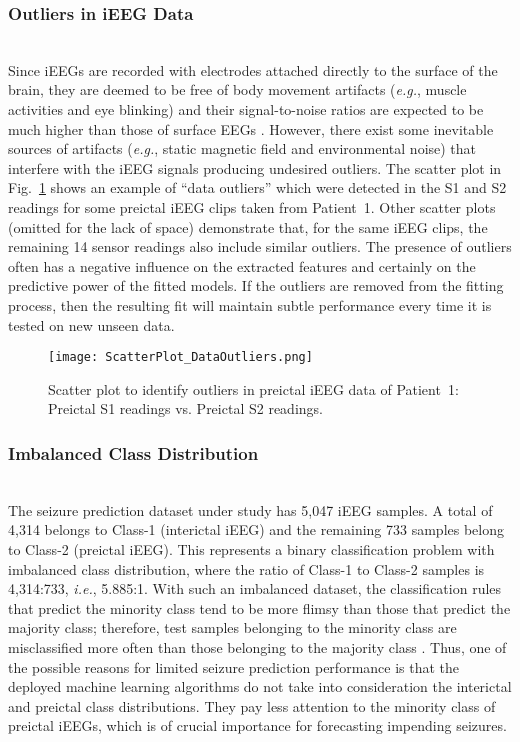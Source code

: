 \documentclass[journal]{IEEEtran}
\begin{document}
\subsubsection{Outliers in iEEG Data}~\\
Since iEEGs are recorded with electrodes attached directly to the surface of the brain, they are deemed to be free of body movement artifacts (\textit{e.g.}, muscle activities and eye blinking) and their signal-to-noise ratios are expected to be much higher than those of surface EEGs \cite{Nunez2010}. However, there exist some inevitable sources of artifacts (\textit{e.g.}, static magnetic field and environmental noise) that interfere with the iEEG signals producing undesired outliers. The scatter plot in Fig.~\ref{Fig_DataOutliers} shows an example of ``data outliers'' which were detected in the S1 and S2 readings for some preictal iEEG clips taken from Patient~1. Other scatter plots (omitted for the lack of space) demonstrate that, for the same iEEG clips, the remaining 14 sensor readings also include similar outliers. The presence of outliers often has a negative influence on the extracted features and certainly on the predictive power of the fitted models. If the outliers are removed from the fitting process, then the resulting fit will maintain subtle performance every time it is tested on new unseen data.



\begin{figure}[!t]\centering
\texttt{[image: ScatterPlot\_DataOutliers.png]}
	\caption{Scatter plot to identify outliers in preictal iEEG data of Patient~1: Preictal S1 readings vs. Preictal S2 readings.}
	\label{Fig_DataOutliers}
\end{figure}

\subsubsection{Imbalanced Class Distribution}~\\
The seizure prediction dataset under study has 5,047 iEEG samples. A total of 4,314 belongs to Class-1 (interictal iEEG) and the remaining 733 samples belong to Class-2 (preictal iEEG). This represents a binary classification problem with imbalanced class distribution, where the ratio of Class-1 to Class-2 samples is 4,314:733, \textit{i.e.}, 5.885:1. With such an imbalanced dataset, the classification rules that predict the minority class tend to be more flimsy than those that predict the majority class; therefore, test samples belonging to the minority class are misclassified more often than those belonging to the majority class \cite{sun2006boosting}. Thus, one of the possible reasons for limited seizure prediction performance is that the deployed machine learning algorithms do not take into consideration the interictal and preictal class distributions. They pay less attention to the minority class of preictal iEEGs, which is of crucial importance for forecasting impending seizures.
\end{document}
